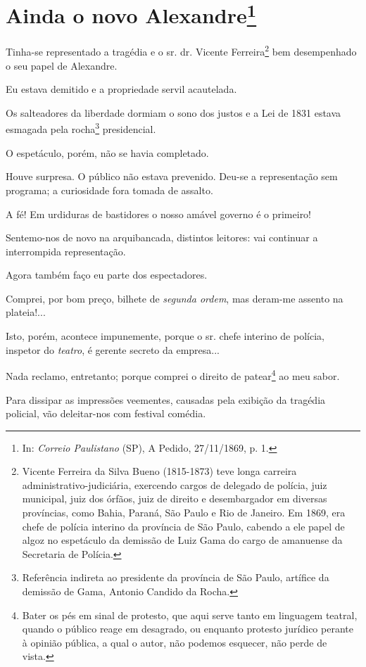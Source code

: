 \chapter{Ainda o novo Alexandre\footnote[*]{In: \emph{Correio
  Paulistano} (SP), A Pedido, 27/11/1869, p. 1.}}


Tinha-se representado a tragédia e o sr. dr. Vicente Ferreira\footnote{
  Vicente Ferreira da Silva Bueno (1815-1873) teve longa carreira
  administrativo-judiciária, exercendo cargos de delegado de polícia,
  juiz municipal, juiz dos órfãos, juiz de direito e desembargador em
  diversas províncias, como Bahia, Paraná, São Paulo e Rio de Janeiro.
  Em 1869, era chefe de polícia interino da província de São Paulo,
  cabendo a ele papel de algoz no espetáculo da demissão de Luiz Gama do
  cargo de amanuense da Secretaria de Polícia.} bem desempenhado o seu
papel de Alexandre.

Eu estava demitido e a propriedade servil acautelada.

Os salteadores da liberdade dormiam o sono dos justos e a Lei de 1831
estava esmagada pela rocha\footnote{Referência indireta ao presidente
  da província de São Paulo, artífice da demissão de Gama, Antonio
  Candido da Rocha.} presidencial.

O espetáculo, porém, não se havia completado.

Houve surpresa. O público não estava prevenido. Deu-se a representação
sem programa; a curiosidade fora tomada de assalto.

A fé! Em urdiduras de bastidores o nosso amável governo é o primeiro!

Sentemo-nos de novo na arquibancada, distintos leitores: vai continuar a
interrompida representação.

Agora também faço eu parte dos espectadores.

Comprei, por bom preço, bilhete de \emph{segunda ordem}, mas deram-me
assento na plateia!...

Isto, porém, acontece impunemente, porque o sr. chefe interino de
polícia, inspetor do \emph{teatro}, é gerente secreto da empresa...

Nada reclamo, entretanto; porque comprei o direito de patear\footnote{
  Bater os pés em sinal de protesto, que aqui serve tanto em linguagem
  teatral, quando o público reage em desagrado, ou enquanto protesto
  jurídico perante à opinião pública, a qual o autor, não podemos
  esquecer, não perde de vista.} ao meu sabor.

Para dissipar as impressões veementes, causadas pela exibição da
tragédia policial, vão deleitar-nos com festival comédia.

